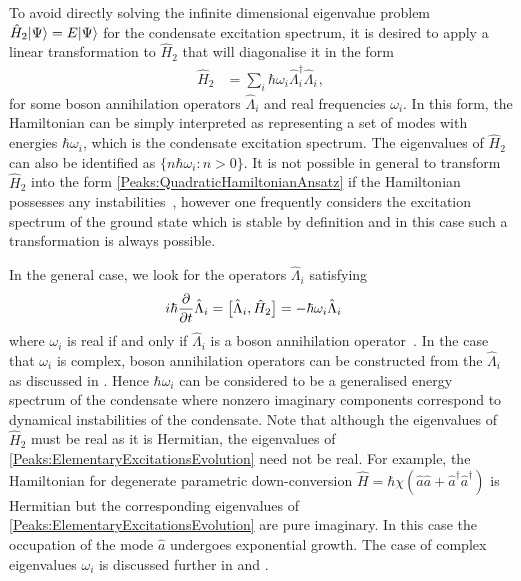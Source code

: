 To avoid directly solving the infinite dimensional eigenvalue problem $\hat{H}_2 {\left|\Psi\right>} = E {\left|\Psi\right>}$ for the condensate excitation spectrum, it is desired to apply a linear transformation to $\hat{H}_2$ that will diagonalise it in the form
\begin{align}
    \label{Peaks:QuadraticHamiltonianAnsatz}
    \hat{H}_2 &= \sum_i \hbar \omega_i \hat{\Lambda}_i^\dagger \hat{\Lambda}_i^{\phantom{\dagger}},
\end{align}
for some boson annihilation operators $\hat{\Lambda}_i$ and real frequencies $\omega_i$. In this form, the Hamiltonian can be simply interpreted as representing a set of modes with energies $\hbar \omega_i$, which is the condensate excitation spectrum. The eigenvalues of $\hat{H}_2$ can also be identified as $\{n \hbar \omega_i : n > 0 \}$. It is not possible in general to transform $\hat{H}_2$ into the form \eqref{Peaks:QuadraticHamiltonianAnsatz} if the Hamiltonian possesses any instabilities~\citep{Leonhardt:2003}, however one frequently considers the excitation spectrum of the ground state which is stable by definition and in this case such a transformation is always possible.

In the general case, we look for the operators $\hat{\Lambda}_i$ satisfying
\begin{align}
    \label{Peaks:ElementaryExcitationsEvolution}
    i \hbar \frac{\partial }{\partial t}\hat{\Lambda}_i &= \comm{\hat{\Lambda}_i, \hat{H}_2 } = - \hbar \omega_i \hat{\Lambda}_i
\end{align}
where $\omega_i$ is real if and only if $\hat{\Lambda}_i$ is a boson annihilation operator~\citep{Leonhardt:2003}. In the case that $\omega_i$ is complex, boson annihilation operators can be constructed from the $\hat{\Lambda}_i$ as discussed in . Hence $\hbar\omega_i$ can be considered to be a generalised energy spectrum of the condensate where nonzero imaginary components correspond to dynamical instabilities of the condensate. Note that although the eigenvalues of $\hat{H}_2$ must be real as it is Hermitian, the eigenvalues of \eqref{Peaks:ElementaryExcitationsEvolution} need not be real. For example, the Hamiltonian for degenerate parametric down-conversion $\hat{H} = \hbar\chi \left(\hat{a}\hat{a} + \hat{a}^\dagger \hat{a}^\dagger \right)$ is Hermitian but the corresponding eigenvalues of \eqref{Peaks:ElementaryExcitationsEvolution} are pure imaginary. In this case the occupation of the mode $\hat{a}$ undergoes exponential growth. The case of complex eigenvalues $\omega_i$ is discussed further in  and .

